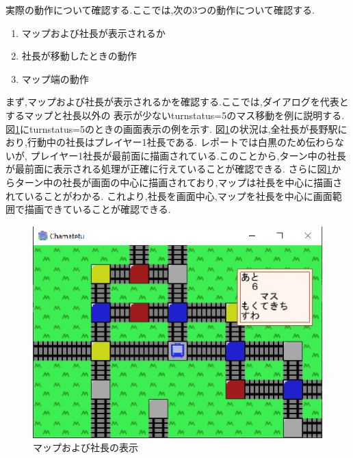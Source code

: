 \documentclass[a4j]{jarticle}
\begin{document}
        実際の動作について確認する.ここでは,次の3つの動作について確認する.
        \begin{enumerate}
            \item マップおよび社長が表示されるか
            \item 社長が移動したときの動作
            \item マップ端の動作
        \end{enumerate}
    
    まず,マップおよび社長が表示されるかを確認する.ここでは,ダイアログを代表とするマップと社長以外の
    表示が少ないturnstatus=5のマス移動を例に説明する.図\ref{mapplay1}にturnstatus=5のときの画面表示の例を示す.
    図\ref{mapplay1}の状況は,全社長が長野駅におり,行動中の社長はプレイヤー1社長である. レポートでは白黒のため伝わらないが,
    プレイヤー1社長が最前面に描画されている.このことから,ターン中の社長が最前面に表示される処理が正確に行えていることが確認できる.
    さらに図\ref{mapplay1}からターン中の社長が画面の中心に描画されており,マップは社長を中心に描画されていることがわかる.
    これより,社長を画面中心,マップを社長を中心に画面範囲で描画できていることが確認できる.

            \begin{figure}[H]
                \centering
                \includegraphics[scale=1.3]{mapplay1.eps}
                \caption{マップおよび社長の表示}
                 \label{mapplay1}
                \end{figure} 
\end{document}
